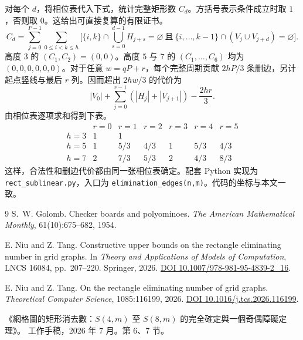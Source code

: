 \documentclass[UTF8,11pt,a4paper,fontset=none]{ctexart}
\theoremstyle{plain}
\theoremstyle{definition}
\begin{document}
对每个 \(d\)，将相位表代入下式，统计完整矩形数 \(C_d\)。方括号表示条件成立时取 \(1\)，否则取 \(0\)。这给出可直接复算的有限证书。
\[
C_d=
\sum_{j=0}^{P-1}\sum_{0\le i<k\le h}
\Big[
   \{i,k\}\cap\!\bigcup_{s=0}^{d-1} H_{j+s}=\varnothing
   \ \text{且}\
   \{i,\ldots,k-1\}\cap(V_j\cup V_{j+d})=\varnothing
\Big].
\]
高度 \(3\) 的 \((C_1,C_2)=(0,0)\)。高度 \(5\) 与 \(7\) 的
\((C_1,\ldots,C_6)\) 均为 \((0,0,0,0,0,0)\)。对于任意 \(w=qP+r\)，每个完整周期贡献 \(2hP/3\) 条删边，另计起点竖线与最后 \(r\) 列。因而超出 \(2hw/3\) 的代价为
\[
 |V_0|+\sum_{j=0}^{r-1}(|H_j|+|V_{j+1}|)-\frac{2hr}{3}.
\]
由相位表逐项求和得到下表。
\[
\begin{array}{c|cccccc}
 & r=0&r=1&r=2&r=3&r=4&r=5\\ \hline
 h=3 & 1&1&&&&\\
 h=5 & 1&5/3&4/3&1&5/3&4/3\\
 h=7 & 2&7/3&5/3&2&4/3&8/3
\end{array}
\]
这样，合法性和删边代价都由同一张相位表确定。配套 Python 实现为 \texttt{rect\_sublinear.py}，入口为 \texttt{elimination\_edges(n,m)}。代码的坐标与本文一致。

\begin{thebibliography}{9}
\setlength{\itemsep}{.25\baselineskip}
S.~W. Golomb.
Checker boards and polyominoes.
\emph{The American Mathematical Monthly}, 61(10):675--682, 1954.

E. Niu and Z. Tang.
Constructive upper bounds on the rectangle eliminating number in grid graphs.
In \emph{Theory and Applications of Models of Computation}, LNCS 16084, pp.~207--220. Springer, 2026.
\href{https://doi.org/10.1007/978-981-95-4839-2_16}{DOI 10.1007/978-981-95-4839-2\_16}.

E. Niu and Z. Tang.
On the rectangle eliminating number of grid graphs.
\emph{Theoretical Computer Science}, 1085:116199, 2026.
\href{https://doi.org/10.1016/j.tcs.2026.116199}{DOI 10.1016/j.tcs.2026.116199}.

《網格圖的矩形消去數：\(S(4,m)\) 至 \(S(8,m)\) 的完全確定與一個奇偶障礙定理》。
工作手稿，2026 年 7 月。第 6、7 节。
\end{thebibliography}
\end{document}
